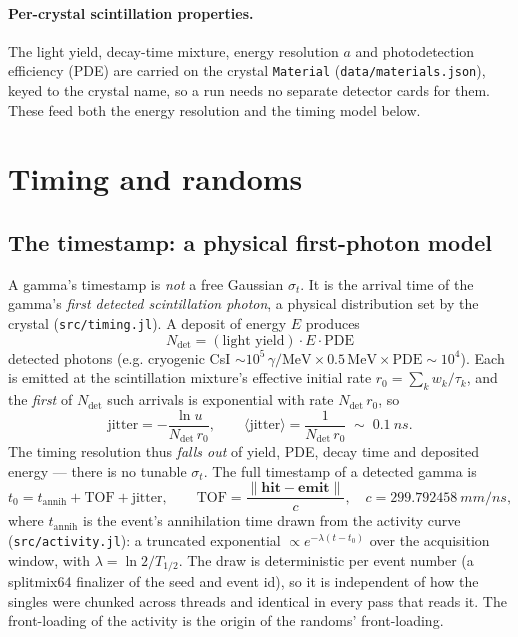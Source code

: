 \documentclass[11pt]{article}
\begin{document}
\paragraph{Per-crystal scintillation properties.}
The light yield, decay-time mixture, energy resolution $a$ and photodetection efficiency
(PDE) are carried on the crystal \texttt{Material} (\texttt{data/materials.json}), keyed to
the crystal name, so a run needs no separate detector cards for them. These feed both the
energy resolution and the timing model below.

\section{Timing and randoms}
\label{sec:timing}

\subsection{The timestamp: a physical first-photon model}
A gamma's timestamp is \emph{not} a free Gaussian $\sigma_t$. It is the arrival time of the
gamma's \emph{first detected scintillation photon}, a physical distribution set by the
crystal (\texttt{src/timing.jl}). A deposit of energy $E$ produces
\begin{equation}
N_{\mathrm{det}} = (\text{light yield})\cdot E \cdot \mathrm{PDE}
\end{equation}
detected photons (e.g. cryogenic CsI $\sim 10^5\,\gamma/\mathrm{MeV}\times 0.5\,\mathrm{MeV}
\times \mathrm{PDE} \sim 10^4$). Each is emitted at the scintillation mixture's effective
initial rate $r_0=\sum_k w_k/\tau_k$, and the \emph{first} of $N_{\mathrm{det}}$ such
arrivals is exponential with rate $N_{\mathrm{det}}\,r_0$, so
\begin{equation}
\text{jitter} = -\frac{\ln u}{N_{\mathrm{det}}\,r_0}, \qquad
\langle\text{jitter}\rangle = \frac{1}{N_{\mathrm{det}}\,r_0}\;\sim\;\SI{0.1}{ns}.
\end{equation}
The timing resolution thus \emph{falls out} of yield, PDE, decay time and deposited energy
--- there is no tunable $\sigma_t$. The full timestamp of a detected gamma is
\begin{equation}
t_0 = t_{\mathrm{annih}} + \mathrm{TOF} + \text{jitter}, \qquad
\mathrm{TOF} = \frac{\lVert \mathbf{hit}-\mathbf{emit}\rVert}{c},
\quad c = \SI{299.792458}{mm/ns},
\end{equation}
where $t_{\mathrm{annih}}$ is the event's annihilation time drawn from the activity curve
(\texttt{src/activity.jl}): a truncated exponential $\propto e^{-\lambda(t-t_0)}$ over the
acquisition window, with $\lambda=\ln 2/T_{1/2}$. The draw is deterministic per event number
(a splitmix64 finalizer of the seed and event id), so it is independent of how the singles
were chunked across threads and identical in every pass that reads it. The front-loading of
the activity is the origin of the randoms' front-loading.
\end{document}
